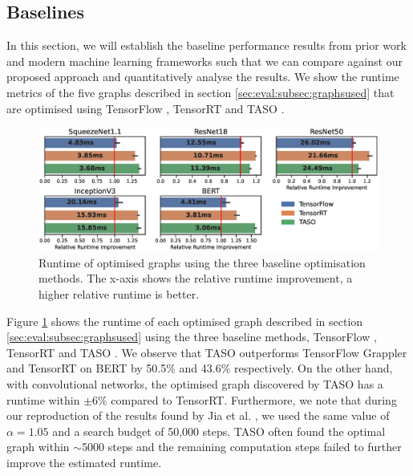 
\subsection{Baselines}
\label{sec:eval:subsec:baseline}

In this section, we will establish the baseline performance results from prior work and modern machine learning frameworks such that we can compare against our proposed approach and quantitatively analyse the results. We show the runtime metrics of the five graphs described in section \ref{sec:eval:subsec:graphsused} that are optimised using TensorFlow \cite{tensorflow2015-whitepaper}, TensorRT \cite{tensorrt2017} and TASO \cite{jia2019taso}.


\begin{figure}[h]
  \centering
  \includegraphics[width=1\columnwidth]{sections/5evaluation/images/runtimes_baseline_h}
  \caption[Baseline runtimes of optimised graphs]{Runtime of optimised graphs using the three baseline optimisation methods. The x-axis shows the relative runtime improvement, a higher relative runtime is better.}
  \label{fig:eval:baseline-runtimes}
\end{figure}

Figure \ref{fig:eval:baseline-runtimes} shows the runtime of each optimised graph described in section \ref{sec:eval:subsec:graphsused} using the three baseline methods, TensorFlow \cite{tensorflow2015-whitepaper}, TensorRT \cite{tensorrt2017} and TASO \cite{jia2019taso}. We observe that TASO outperforms TensorFlow Grappler and TensorRT on BERT by 50.5\% and 43.6\% respectively. On the other hand, with convolutional networks, the optimised graph discovered by TASO has a runtime within $\pm 6$\% compared to TensorRT. Furthermore, we note that during our reproduction of the results found by Jia et al. \cite{jia2019taso}, we used the same value of $\alpha = 1.05$ and a search budget of 50,000 steps. TASO often found the optimal graph within $\sim$5000 steps and the remaining computation steps failed to further improve the estimated runtime.

